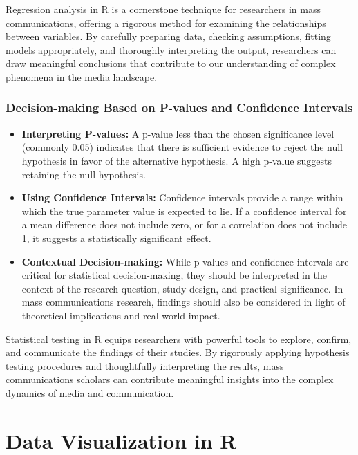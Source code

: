 \documentclass[
]{book}
\begin{document}
Regression analysis in R is a cornerstone technique for researchers in mass communications, offering a rigorous method for examining the relationships between variables. By carefully preparing data, checking assumptions, fitting models appropriately, and thoroughly interpreting the output, researchers can draw meaningful conclusions that contribute to our understanding of complex phenomena in the media landscape.

\subsection*{Decision-making Based on P-values and Confidence Intervals}\label{decision-making-based-on-p-values-and-confidence-intervals}

\begin{itemize}
\item
  \textbf{Interpreting P-values:} A p-value less than the chosen significance level (commonly 0.05) indicates that there is sufficient evidence to reject the null hypothesis in favor of the alternative hypothesis. A high p-value suggests retaining the null hypothesis.
\item
  \textbf{Using Confidence Intervals:} Confidence intervals provide a range within which the true parameter value is expected to lie. If a confidence interval for a mean difference does not include zero, or for a correlation does not include 1, it suggests a statistically significant effect.
\item
  \textbf{Contextual Decision-making:} While p-values and confidence intervals are critical for statistical decision-making, they should be interpreted in the context of the research question, study design, and practical significance. In mass communications research, findings should also be considered in light of theoretical implications and real-world impact.
\end{itemize}

Statistical testing in R equips researchers with powerful tools to explore, confirm, and communicate the findings of their studies. By rigorously applying hypothesis testing procedures and thoughtfully interpreting the results, mass communications scholars can contribute meaningful insights into the complex dynamics of media and communication.

\chapter{Data Visualization in R}\label{data-visualization-in-r}
\end{document}
